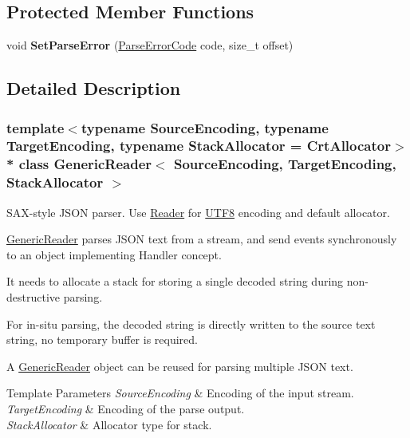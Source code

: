 \subsection*{Protected Member Functions}
\begin{DoxyCompactItemize}
\item 
void {\bfseries Set\+Parse\+Error} (\hyperlink{group__RAPIDJSON__ERRORS_ga8d4b32dfc45840bca189ade2bbcb6ba7}{Parse\+Error\+Code} code, size\+\_\+t offset)\hypertarget{classGenericReader_ae50079444295bf109730c3b708a818a6}{}\label{classGenericReader_ae50079444295bf109730c3b708a818a6}

\end{DoxyCompactItemize}


\subsection{Detailed Description}
\subsubsection*{template$<$typename Source\+Encoding, typename Target\+Encoding, typename Stack\+Allocator = Crt\+Allocator$>$\\*
class Generic\+Reader$<$ Source\+Encoding, Target\+Encoding, Stack\+Allocator $>$}

S\+A\+X-\/style J\+S\+ON parser. Use \hyperlink{reader_8h_a84f3b66a66647f4ac4267078359188ba}{Reader} for \hyperlink{structUTF8}{U\+T\+F8} encoding and default allocator. 

\hyperlink{classGenericReader}{Generic\+Reader} parses J\+S\+ON text from a stream, and send events synchronously to an object implementing Handler concept.

It needs to allocate a stack for storing a single decoded string during non-\/destructive parsing.

For in-\/situ parsing, the decoded string is directly written to the source text string, no temporary buffer is required.

A \hyperlink{classGenericReader}{Generic\+Reader} object can be reused for parsing multiple J\+S\+ON text.


\begin{DoxyTemplParams}{Template Parameters}
{\em Source\+Encoding} & Encoding of the input stream. \\
\hline
{\em Target\+Encoding} & Encoding of the parse output. \\
\hline
{\em Stack\+Allocator} & Allocator type for stack. \\
\hline
\end{DoxyTemplParams}


